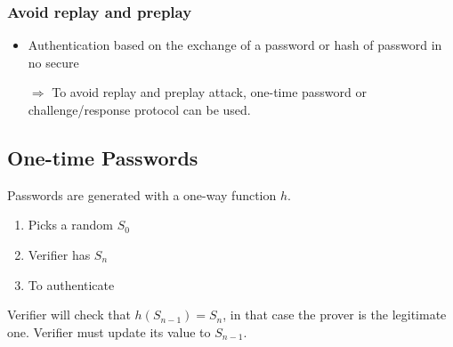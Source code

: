 \subsubsection{Avoid replay and preplay}
\begin{itemize}
    \item Authentication based on the exchange of a password or hash of
        password in no secure
    \item[$\Rightarrow$]
        To avoid replay and preplay attack, one-time password or
        challenge/response protocol can be used.
\end{itemize}

\subsection{One-time Passwords}
Passwords are generated with a one-way function $h$.
\begin{enumerate}
	\item Picks a random $S_0$ 
	\begin{center}
	\end{center}
	\item Verifier has $S_n$
	\begin{center}
	\end{center}
	\item To authenticate
	\begin{center}
	\end{center}
\end{enumerate}
Verifier will check that $h(S_{n-1}) = S_n$, in that case the prover is the
legitimate one. Verifier must update its value to $S_{n-1}$.
